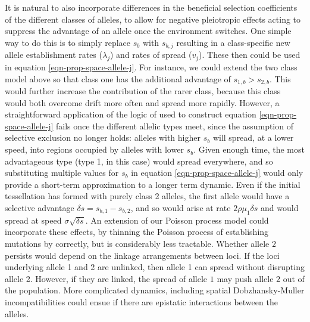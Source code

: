 \documentclass{article}
\begin{document}
It is natural to also incorporate differences in the beneficial selection coefficients of the different classes of alleles, 
to allow for negative pleiotropic effects acting to suppress the advantage of an allele once the environment switches.
One simple way to do this is to simply replace $s_b$ with $s_{b,j}$ 
resulting in a class-specific new allele establishment rates ($\lambda_{j}$) and rates of spread ($v_j$).
These then could be used in equation \eqref{eqn-prop-space-allele-j}. 
For instance, we could extend the two class model above 
so that class one has the additional advantage of $s_{1,b}>s_{2,b}$. 
This would further increase the contribution of the rarer class,
because this class would both overcome drift more often and spread more rapidly. 
However, a straightforward application of the logic of used to construct equation \eqref{eqn-prop-space-allele-j}
fails once the different allelic types meet,
since the assumption of selective exclusion no longer holds:
alleles with higher $s_b$ will spread, at a lower speed, into regions occupied by alleles with lower $s_b$.
Given enough time, the most advantageous type (type 1, in this case) would spread everywhere, 
and so substituting multiple values for $s_b$ in equation \eqref{eqn-prop-space-allele-j}
would only provide a short-term approximation to a longer term dynamic. 
Even if the initial tessellation has formed with purely class 2 alleles, 
the first allele would have a selective advantage $\delta s =s_{b,1}-s_{b,2}$,
and so would arise at rate $2\rho \mu_1 \delta s $ and would spread at speed $\sigma \sqrt{\delta s}$. 
An extension of our Poisson process model could incorporate these effects, 
by thinning the Poisson process of establishing mutations by correctly,
but is considerably less tractable.
Whether allele $2$ persists would depend on the linkage arrangements between loci. 
If the loci underlying allele 1 and 2 are unlinked, then allele 1 can spread without disrupting allele 2. 
However, if they are linked, the spread of allele $1$ may push allele $2$ out of the population. 
More complicated dynamics,
including spatial Dobzhansky-Muller incompatibilities \citep{Kondrashov:03,ralphcoop2010} 
could ensue if there are epistatic interactions between the alleles. 

\end{document}
